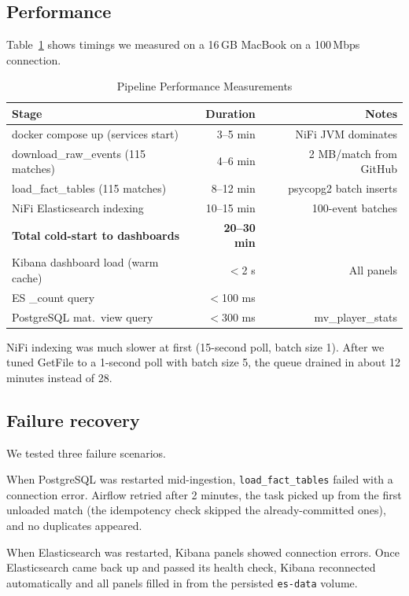 \documentclass[conference]{IEEEtran}
\begin{document}
\subsection{Performance}

Table~\ref{tab:perf} shows timings we measured on a 16\,GB MacBook on a
100\,Mbps connection.

\begin{table}[ht]
\caption{Pipeline Performance Measurements}
\label{tab:perf}
\renewcommand{\arraystretch}{1.1}
\begin{tabular}{@{}lrr@{}}
\toprule
\textbf{Stage} & \textbf{Duration} & \textbf{Notes} \\
\midrule
docker compose up (services start) & 3--5 min & NiFi JVM dominates \\
download\_raw\_events (115 matches) & 4--6 min & ~2 MB/match from GitHub \\
load\_fact\_tables (115 matches) & 8--12 min & psycopg2 batch inserts \\
NiFi Elasticsearch indexing & 10--15 min & 100-event batches \\
\textbf{Total cold-start to dashboards} & \textbf{20--30 min} & \\
\midrule
Kibana dashboard load (warm cache) & $<$2 s & All panels \\
ES \_count query & $<$100 ms & \\
PostgreSQL mat.\ view query & $<$300 ms & mv\_player\_stats \\
\bottomrule
\end{tabular}
\end{table}

NiFi indexing was much slower at first (15-second poll, batch size 1). After
we tuned GetFile to a 1-second poll with batch size 5, the queue drained in
about 12 minutes instead of 28.

\subsection{Failure recovery}

We tested three failure scenarios.

When PostgreSQL was restarted mid-ingestion, \texttt{load\_fact\_tables}
failed with a connection error. Airflow retried after 2 minutes, the task
picked up from the first unloaded match (the idempotency check skipped the
already-committed ones), and no duplicates appeared.

When Elasticsearch was restarted, Kibana panels showed connection errors.
Once Elasticsearch came back up and passed its health check, Kibana
reconnected automatically and all panels filled in from the persisted
\texttt{es-data} volume.
\end{document}
